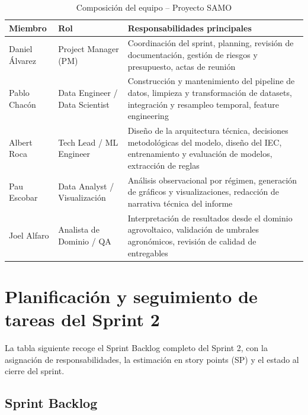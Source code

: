 \documentclass[12pt,a4paper]{article}
\begin{document}
\begin{table}[H]
\centering
\caption{Composición del equipo -- Proyecto SAMO}
\label{tab:equipo}
\renewcommand{\arraystretch}{1.4}
\begin{tabularx}{\textwidth}{llX}
\toprule
\textbf{Miembro} & \textbf{Rol} & \textbf{Responsabilidades principales} \\
\midrule
Daniel Álvarez
  & Project Manager (PM)
  & Coordinación del sprint, planning, revisión de documentación, gestión de riesgos y presupuesto, actas de reunión \\
Pablo Chacón
  & Data Engineer / Data Scientist
  & Construcción y mantenimiento del pipeline de datos, limpieza y transformación de datasets, integración y resampleo temporal, feature engineering \\
Albert Roca
  & Tech Lead / ML Engineer
  & Diseño de la arquitectura técnica, decisiones metodológicas del modelo, diseño del IEC, entrenamiento y evaluación de modelos, extracción de reglas \\
Pau Escobar
  & Data Analyst / Visualización
  & Análisis observacional por régimen, generación de gráficos y visualizaciones, redacción de narrativa técnica del informe \\
Joel Alfaro
  & Analista de Dominio / QA
  & Interpretación de resultados desde el dominio agrovoltaico, validación de umbrales agronómicos, revisión de calidad de entregables \\
\bottomrule
\end{tabularx}
\end{table}

\newpage
\section{Planificación y seguimiento de tareas del Sprint 2}

La tabla siguiente recoge el Sprint Backlog completo del Sprint 2, con la asignación de responsabilidades, la estimación en story points (SP) y el estado al cierre del sprint.

\subsection{Sprint Backlog}
\end{document}
